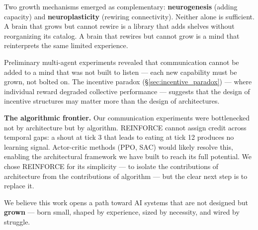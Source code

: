 \documentclass{article}
\begin{document}
Two growth mechanisms emerged as complementary: \textbf{neurogenesis} (adding capacity) and \textbf{neuroplasticity} (rewiring connectivity). Neither alone is sufficient. A brain that grows but cannot rewire is a library that adds shelves without reorganizing its catalog. A brain that rewires but cannot grow is a mind that reinterprets the same limited experience.

Preliminary multi-agent experiments revealed that communication cannot be added to a mind that was not built to listen --- each new capability must be grown, not bolted on. The incentive paradox (\S\ref{sec:incentive_paradox}) --- where individual reward degraded collective performance --- suggests that the design of incentive structures may matter more than the design of architectures.

\textbf{The algorithmic frontier.} Our communication experiments were bottlenecked not by architecture but by algorithm. REINFORCE cannot assign credit across temporal gaps: a shout at tick 3 that leads to eating at tick 12 produces no learning signal. Actor-critic methods (PPO, SAC) would likely resolve this, enabling the architectural framework we have built to reach its full potential. We chose REINFORCE for its simplicity --- to isolate the contributions of architecture from the contributions of algorithm --- but the clear next step is to replace it.

We believe this work opens a path toward AI systems that are not designed but \textbf{grown} --- born small, shaped by experience, sized by necessity, and wired by struggle.
\end{document}
